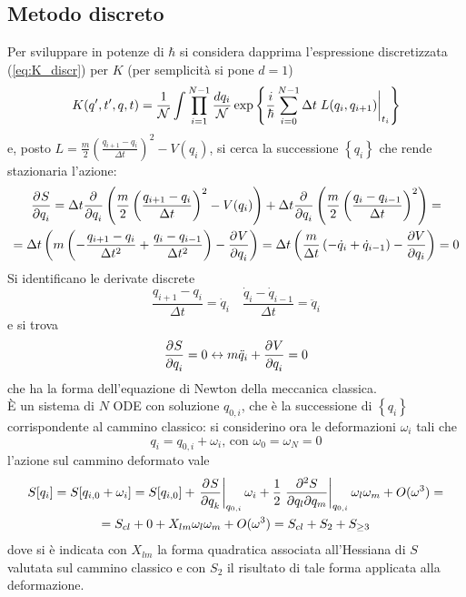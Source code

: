 \subsection{Metodo discreto}
Per sviluppare in potenze di $\hbar$ si considera dapprima l'espressione discretizzata
(\ref{eq:K_discr}) per $K$ (per semplicità si pone $d=1$)
$$
K(q',t',q,t)=\frac{1}{\mathcal{N}}\int\prod_{i=1}^{N-1}\frac{dq_i}{\mathcal{N}}
\exp\left\{\frac{i}{\hbar}\sum_{i=0}^{N-1}\Delta t \eval{L(q_i,q_{i+1})}_{t_i}\right\}
$$
e, posto $L=\frac{m}{2}\left(\frac{q_{i+1}-q_i}{\Delta t}\right)^2-V(q_i)$, si cerca la successione
$\left\{q_i\right\}$ che rende stazionaria l'azione:
\begin{gather*}
\pdv[]{S}{q_i} = \Delta t\pdv[]{}{q_i}\left(\frac{m}{2}\left(\frac{q_{i+1}-q_i}{\Delta t}\right)^2-V(q_i)
\right) + \Delta t\pdv[]{}{q_i}\left(\frac{m}{2}\left(\frac{q_i-q_{i-1}}{\Delta t}\right)^2\right) = \\
=\Delta t\left( m\left(-\frac{q_{i+1}-q_i}{\Delta t^2}+\frac{q_i-q_{i-1}}{\Delta t^2}\right)-
\pdv[]{V}{q_i}\right) = \Delta t\left(\frac{m}{\Delta t}\left(-\dot q_i + \dot q_{i-1}\right)-
\pdv{V}{q_i}\right)=0
\end{gather*}
Si identificano le derivate discrete
$$\frac{q_{i+1}-q_i}{\Delta t} = \dot q_i\quad \frac{\dot q_{i}-\dot q_{i-1}}{\Delta t} = \ddot q_i$$
e si trova
$$\pdv[]{S}{q_i} =0 \leftrightarrow m\ddot q_i + \pdv[]{V}{q_i} = 0$$
che ha la forma dell'equazione di Newton della meccanica classica.\\
È un sistema di $N$ ODE con soluzione $q_{0,i}$, che è la successione di $\left\{q_i\right\}$
corrispondente al cammino classico: si considerino ora le deformazioni $\omega_i$ tali che
$$q_i = q_{0,i} + \omega_i\text{, con }\omega_0 = \omega_N = 0$$
l'azione sul cammino deformato vale
\begin{gather*}
S[q_i] = S[q_{i,0}+\omega_i] = S[q_{i,0}] + \eval{\pdv[]{S}{q_k}}_{q_{0,i}}\omega_i + \frac{1}{2}
\eval{\pdv{S}{q_l}{q_m}}_{q_{0,i}}\omega_l\omega_m + O(\omega^3) = \\
= S_{cl} + 0 +X_{lm}\omega_l\omega_m + O(\omega^3) = S_{cl} + S_2 +S_{\geq3}
\end{gather*}
dove si è indicata con $X_{lm}$ la forma quadratica associata all'Hessiana di $S$ valutata sul
cammino classico e con $S_2$ il risultato di tale forma applicata alla deformazione.

